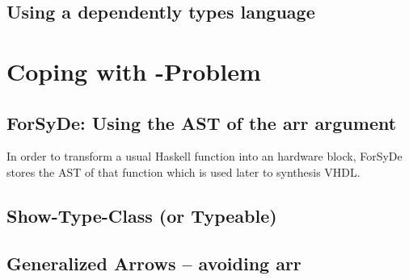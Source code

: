 \documentclass{article}
\begin{document}
\subsection{Using a dependently types language}

\section{Coping with -Problem}

\subsection{ForSyDe: Using the AST of the arr argument}

In order to transform a usual Haskell function into an hardware block, ForSyDe stores the AST of that function which is
used later to synthesis VHDL.

\subsection{Show-Type-Class (or Typeable)}

\subsection{Generalized Arrows -- avoiding arr}
\end{document}
